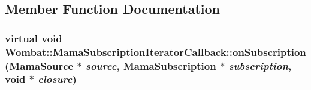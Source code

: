 \subsection{Member Function Documentation}
\hypertarget{classWombat_1_1MamaSubscriptionIteratorCallback_a62864194bc7afdf0f5ff1ea892c0d01a}{
\subsubsection[{onSubscription}]{\setlength{\rightskip}{0pt plus 5cm}virtual void Wombat::MamaSubscriptionIteratorCallback::onSubscription ({\bf MamaSource} $\ast$ {\em source}, \/  {\bf MamaSubscription} $\ast$ {\em subscription}, \/  void $\ast$ {\em closure})}}
\label{classWombat_1_1MamaSubscriptionIteratorCallback_a62864194bc7afdf0f5ff1ea892c0d01a}
